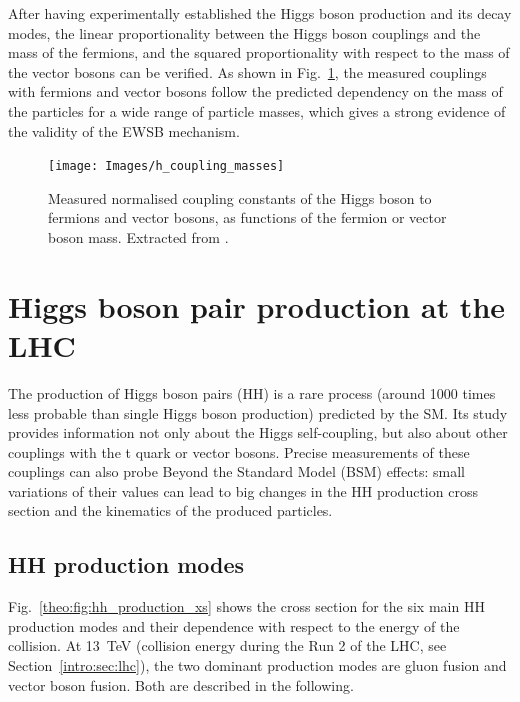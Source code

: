 \documentclass[../main.tex]{subfiles}
\begin{document}
After having experimentally established the Higgs boson production and its decay modes, the linear proportionality between the Higgs boson couplings and the mass of the fermions, and the squared proportionality with respect to the mass of the vector bosons can be verified. As shown in Fig.~\ref{theo:fig:h_coupling_masses}, the measured couplings with fermions and vector bosons follow the predicted dependency on the mass of the particles for a wide range of particle masses, which gives a strong evidence of the validity of the EWSB mechanism.

\begin{figure}[h!]
\begin{center}
\texttt{[image: Images/h\_coupling\_masses]}
\end{center}
\caption[Normalised coupling constants of the Higgs boson to fermions and vector bosons]{Measured normalised coupling constants of the Higgs boson to fermions and vector bosons, as functions of the fermion or vector boson mass. Extracted from \cite{hh:analysis:nature}.}
\label{theo:fig:h_coupling_masses}
\end{figure}

\section{Higgs boson pair production at the LHC}
\label{theo:sec:hh}

The production of Higgs boson pairs (HH) is a rare process (around 1000 times less probable than single Higgs boson production) predicted by the SM. Its study provides information not only about the Higgs self-coupling, but also about other couplings with the t quark or vector bosons. Precise measurements of these couplings can also probe Beyond the Standard Model (BSM) effects: small variations of their values can lead to big changes in the HH production cross section and the kinematics of the produced particles.

\subsection{HH production modes}

Fig.~\ref{theo:fig:hh_production_xs} shows the cross section for the six main HH production modes and their dependence with respect to the energy of the collision. At 13~TeV (collision energy during the Run 2 of the LHC, see Section~\ref{intro:sec:lhc}), the two dominant production modes are gluon fusion and vector boson fusion. Both are described in the following.
\end{document}
